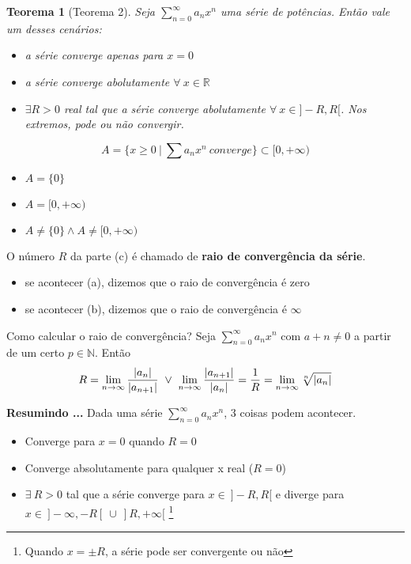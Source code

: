 \documentclass[12pt,openany, letterpaper]{book}
\newtheorem{theorem}{Teorema}[section]
\newcommand{\LI}[1][n]{\lim_{{#1} \rightarrow \infty}}
\newcommand{\soma}[2][n]{\sum_{{#1} = #2}^\infty}
\begin{document}
{{\begin{theorem}[Teorema 2]\label{T:5-2}
Seja  $\displaystyle{\soma{0} a_n x^n}$ uma série de potências. Então vale um desses cenários: \begin{itemize}
\item [(a)] a série converge apenas para $x=0$
\item [(b)] a série converge abolutamente $\forall \ x \in \mathds{R}$
\item [(c)] $\exists R > 0$ real tal que a série converge abolutamente $\forall \ x \in ]-R, R[$. Nos extremos, pode ou não convergir.
\end{itemize}

\end{theorem}

$$A = \{x\geq 0 \ | \ \sum a_n x^n \ converge\} \subset [0, +\infty)$$
\begin{itemize}
\item [a.] $A = \{0\}$
\item [b.] $A = [0, +\infty)$
\item [c.] $A \neq \{0\} \land A \neq [0, +\infty)$
\end{itemize}

O número $R$ da parte (c) é chamado de \textbf{raio de convergência da série}. \begin{itemize}
\item se acontecer (a), dizemos que o raio de convergência é zero
\item se acontecer (b), dizemos que o raio de convergência é $\infty$
\end{itemize}

Como calcular o raio de convergência? Seja $\soma{0}a_n x^n$ com $a+n \neq 0$ a partir de um certo $p \in \mathds{N}$. Então $$ R = \LI \frac{|a_n|}{|a_{n+1}|} \  \lor \ \LI \frac{|a_{n+1}|}{|a_n|} = {1 \over R} = \LI \sqrt[n]{|a_n|} $$

\textbf{Resumindo ...} Dada uma série $\displaystyle{\soma{0} a_n x^n}$, 3 coisas podem acontecer. \begin{itemize}
\item Converge para $x = 0$ quando $R = 0$
\item Converge absolutamente para qualquer x real ($R = 0$)
\item $ \exists \ R > 0$ tal que a série converge para $x \in \ ]-R,R[$ e diverge para $ x \in \ ]-\infty,-R[\ \cup \ ]R,+\infty[$ \footnote{Quando $x = \pm R$, a série pode ser convergente ou não}
\end{itemize}

}}
\end{document}
